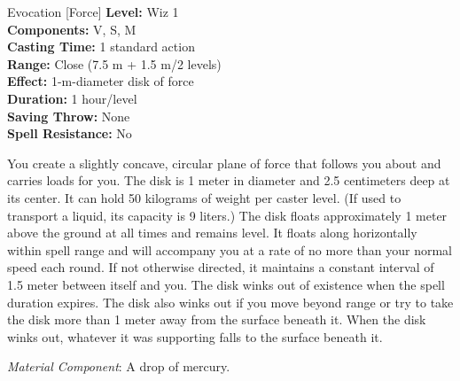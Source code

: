 {Evocation [Force]}
{
	\textbf{Level:}
	Wiz 1\\
	\textbf{Components:}
	V, S, M\\
	\textbf{Casting Time:}
	1 standard action\\
	\textbf{Range:}
	Close (7.5 m + 1.5 m/2 levels)\\
	\textbf{Effect:}
	1-m-diameter disk of force\\
	\textbf{Duration:}
	1 hour/level\\
	\textbf{Saving Throw:}
	None\\
	\textbf{Spell Resistance:}
	No\\
}
{
	You create a slightly concave, circular plane of force that follows you about and carries loads for you. The disk is 1 meter in diameter and 2.5 centimeters deep at its center. It can hold 50 kilograms of weight per caster level. (If used to transport a liquid, its capacity is 9 liters.) The disk floats approximately 1 meter above the ground at all times and remains level. It floats along horizontally within spell range and will accompany you at a rate of no more than your normal speed each round. If not otherwise directed, it maintains a constant interval of 1.5 meter between itself and you. The disk winks out of existence when the spell duration expires. The disk also winks out if you move beyond range or try to take the disk more than 1 meter away from the surface beneath it. When the disk winks out, whatever it was supporting falls to the surface beneath it.

	\textit{Material Component}:
	A drop of mercury.

}
